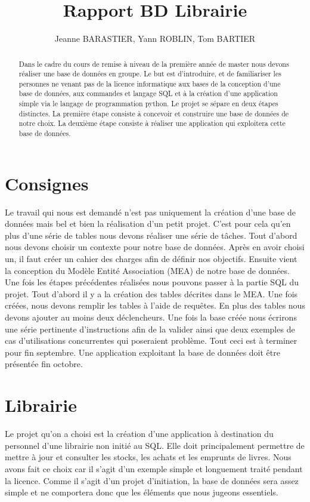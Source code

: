 \documentclass[10pt,a4paper]{scrartcl}
\title{Rapport BD Librairie}
\author{Jeanne BARASTIER, Yann ROBLIN, Tom BARTIER}
\begin{document}
\maketitle
\begin{abstract}
    Dans le cadre du cours de remise à niveau de la première année de master nous devons réaliser une base de données en groupe. Le but est d’introduire, et de familiariser 
    les personnes ne venant pas de la licence informatique aux bases de la conception d’une base de données, 
    aux commandes et langage SQL et à la création d’une application simple via le langage de programmation python. 
    Le projet se sépare en deux étapes distinctes. La première étape consiste à concevoir et construire une base de 
    données de notre choix. La deuxième étape consiste à réaliser une application qui exploitera cette base de données.
\end{abstract}

\tableofcontents

\newpage
\section{Consignes}
Le travail qui nous est demandé n’est pas uniquement la création d’une base de 
données mais bel et bien la réalisation d’un petit projet. C’est pour cela qu’en 
plus d’une série de tables nous devons réaliser une série de tâches. Tout d’abord nous 
devons choisir un contexte pour notre base de données. Après en avoir choisi un, il faut
 créer un cahier des charges afin de définir nos objectifs. Ensuite vient la conception
  du Modèle Entité Association (MEA) de notre base de données. Une fois les étapes 
  précédentes réalisées nous pouvons passer à la partie SQL du projet. Tout d’abord il 
  y a la création des tables décrites dans le MEA. Une fois créées, nous devons remplir
   les tables à l’aide de requêtes. En plus des tables nous devons ajouter au moins deux
    déclencheurs. Une fois la base créée nous écrirons une série pertinente 
    d’instructions afin de la valider ainsi que deux exemples de cas d’utilisations 
    concurrentes qui poseraient problème. Tout ceci est à terminer pour fin septembre. 
Une application exploitant la base de données doit être présentée fin octobre.

\section{Librairie}
Le projet qu’on a choisi est la création d’une application à destination du personnel d’une librairie non initié au SQL. Elle doit principalement permettre de mettre à jour 
et consulter les stocks, les achats et les emprunts de livres. Nous avons fait ce choix car il s’agit d’un exemple simple et 
longuement traité pendant la licence. Comme il s’agit d’un projet d’initiation, la base de données sera assez simple et ne comportera donc que les éléments que nous jugeons essentiels.
\end{document}
